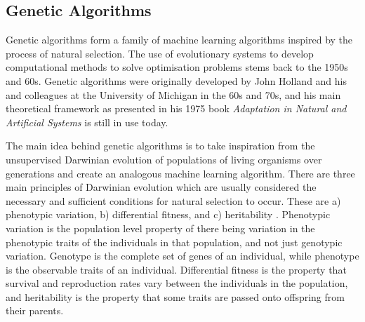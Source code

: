 \documentclass[multicolumn, 12pt]{extarticle}
\begin{document}
\subsection{Genetic Algorithms}
Genetic algorithms form a family of machine learning algorithms inspired by the process of natural selection. The use of evolutionary systems to develop computational methods to solve optimisation problems stems back to the 1950s and 60s. Genetic algorithms were originally developed by John Holland and his and colleagues at the University of Michigan in the 60s and 70s, and his main theoretical framework as presented in his 1975 book \textit{Adaptation in Natural and Artificial Systems} \cite{Holland} is still in use today.

The main idea behind genetic algorithms is to take inspiration from the unsupervised Darwinian evolution of populations of living organisms over generations and create an analogous machine learning algorithm. There are three main principles of Darwinian evolution which are usually considered the necessary and sufficient conditions for natural selection to occur. These are a) phenotypic variation, b) differential fitness, and c) heritability \cite{Mitchell}. Phenotypic variation is the population level property of there being variation in the phenotypic traits of the individuals in that population, and not just genotypic variation. Genotype is the complete set of genes of an individual, while phenotype is the observable traits of an individual. Differential fitness is the property that survival and reproduction rates vary between the individuals in the population, and heritability is the property that some traits are passed onto offspring from their parents.
\end{document}
